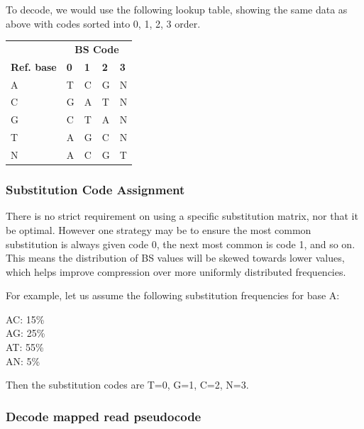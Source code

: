\documentclass[a4paper]{article}
\begin{document}
\vskip10pt

To decode, we would use the following lookup table, showing the same data as above with codes sorted into 0, 1, 2, 3 order.

\begin{tabular}{l|llll}
& \multicolumn{4}{c}{\textbf{BS Code}}\\
\textbf{Ref. base} & \textbf{0} & \textbf{1} & \textbf{2} & \textbf{3} \\
\hline
A & T & C & G & N\\
C & G & A & T & N\\
G & C & T & A & N\\
T & A & G & C & N\\
N & A & C & G & T
\end{tabular}


\subsubsection*{Substitution Code Assignment}

There is no strict requirement on using a specific substitution
matrix, nor that it be optimal.  However one strategy may be to ensure
the most common substitution is always given code 0, the next most
common is code 1, and so on.  This means the distribution of BS values
will be skewed towards lower values, which helps improve compression
over more uniformly distributed frequencies.

For example, let us assume the following substitution frequencies for base A: 

AC: 15\%\\
AG: 25\%\\
AT: 55\%\\
AN: 5\%

Then the substitution codes are T=0, G=1, C=2, N=3.

\subsubsection*{Decode mapped read pseudocode}
\end{document}
